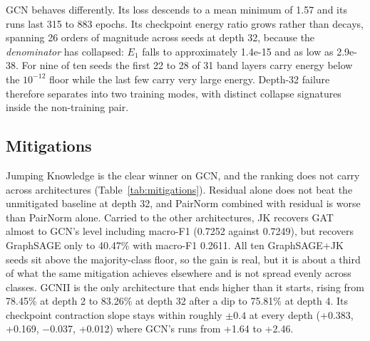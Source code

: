 \documentclass[
  conference]{IEEEtran}
\begin{document}
GCN behaves differently. Its loss descends to a mean minimum of 1.57 and
its runs last 315 to 883 epochs. Its checkpoint energy ratio grows
rather than decays, spanning 26 orders of magnitude across seeds at
depth 32, because the \emph{denominator} has collapsed: \(E_1\) falls to
approximately 1.4e-15 and as low as 2.9e-38. For nine of ten seeds the
first 22 to 28 of 31 band layers carry energy below the \(10^{-12}\)
floor while the last few carry very large energy. Depth-32 failure
therefore separates into two training modes, with distinct collapse
signatures inside the non-training pair.

\subsection{Mitigations}\label{mitigations-2}

Jumping Knowledge is the clear winner on GCN, and the ranking does not
carry across architectures (Table~\ref{tab:mitigations}). Residual alone
does not beat the unmitigated baseline at depth 32, and PairNorm
combined with residual is worse than PairNorm alone. Carried to the
other architectures, JK recovers GAT almost to GCN's level including
macro-F1 (0.7252 against 0.7249), but recovers GraphSAGE only to 40.47\%
with macro-F1 0.2611. All ten GraphSAGE+JK seeds sit above the
majority-class floor, so the gain is real, but it is about a third of
what the same mitigation achieves elsewhere and is not spread evenly
across classes. GCNII is the only architecture that ends higher than it
starts, rising from 78.45\% at depth 2 to 83.26\% at depth 32 after a
dip to 75.81\% at depth 4. Its checkpoint contraction slope stays within
roughly \(\pm 0.4\) at every depth (+0.383, +0.169, −0.037, +0.012)
where GCN's runs from +1.64 to +2.46.
\end{document}
